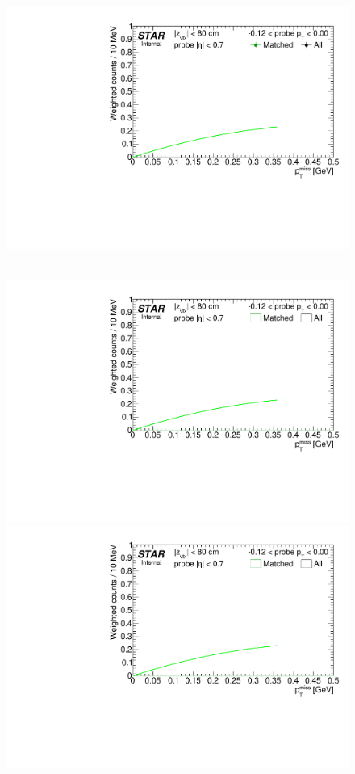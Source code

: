 \begin{figure}[ht]
{  \includegraphics[width=\linewidth,page=9]{graphics/systematicsEfficiency/TOF_tagAndProbe/Fitting_effVsPt_data.CPT.pdf}
}~
\parbox{0.495\textwidth}{
  \centering
  \includegraphics[width=\linewidth,page=7]{graphics/systematicsEfficiency/TOF_tagAndProbe/Fitting_effVsPt_mc.CPT.pdf}\\
  \includegraphics[width=\linewidth,page=8]{graphics/systematicsEfficiency/TOF_tagAndProbe/Fitting_effVsPt_mc.CPT.pdf}\\
}
\end{figure}
